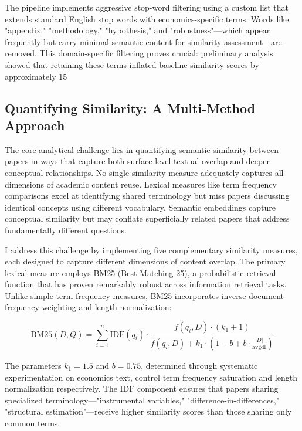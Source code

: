 \documentclass[12pt]{article}
\begin{document}
The pipeline implements aggressive stop-word filtering using a custom list that extends standard English stop words with economics-specific terms. Words like "appendix," "methodology," "hypothesis," and "robustness"—which appear frequently but carry minimal semantic content for similarity assessment—are removed. This domain-specific filtering proves crucial: preliminary analysis showed that retaining these terms inflated baseline similarity scores by approximately 15%

\subsection{Quantifying Similarity: A Multi-Method Approach}

The core analytical challenge lies in quantifying semantic similarity between papers in ways that capture both surface-level textual overlap and deeper conceptual relationships. No single similarity measure adequately captures all dimensions of academic content reuse. Lexical measures like term frequency comparisons excel at identifying shared terminology but miss papers discussing identical concepts using different vocabulary. Semantic embeddings capture conceptual similarity but may conflate superficially related papers that address fundamentally different questions. 

I address this challenge by implementing five complementary similarity measures, each designed to capture different dimensions of content overlap. The primary lexical measure employs BM25 (Best Matching 25), a probabilistic retrieval function that has proven remarkably robust across information retrieval tasks. Unlike simple term frequency measures, BM25 incorporates inverse document frequency weighting and length normalization:

\begin{equation}
\text{BM25}(D,Q) = \sum_{i=1}^{n} \text{IDF}(q_i) \cdot \frac{f(q_i, D) \cdot (k_1 + 1)}{f(q_i, D) + k_1 \cdot (1 - b + b \cdot \frac{|D|}{\text{avgdl}})}
\end{equation}

The parameters $k_1 = 1.5$ and $b = 0.75$, determined through systematic experimentation on economics text, control term frequency saturation and length normalization respectively. The IDF component ensures that papers sharing specialized terminology—"instrumental variables," "difference-in-differences," "structural estimation"—receive higher similarity scores than those sharing only common terms.
\end{document}
